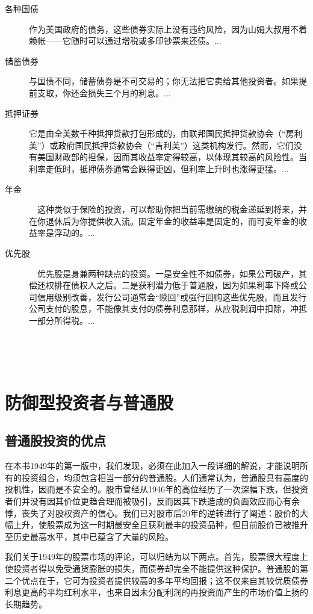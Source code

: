 \documentclass[12pt,oneside]{book}
\begin{document}
\begin{description}
\item[各种国债] 作为美国政府的债务，这些债券实际上没有违约风险，因为山姆大叔用不着赖帐——它随时可以通过增税或多印钞票来还债。...
\item[储蓄债券] 与国债不同，储蓄债券是不可交易的；你无法把它卖给其他投资者。如果提前支取，你还会损失三个月的利息。...
\item[抵押证券] 它是由全美数千种抵押贷款打包形成的，由联邦国民抵押贷款协会（“房利美”）或政府国民抵押贷款协会（“吉利美”）这类机构发行。然而，它们没有美国财政部的担保，因而其收益率定得较高，以体现其较高的风险性。当利率走低时，抵押债券通常会跌得更凶，但利率上升时也涨得更猛。...

\item[年金]　这种类似于保险的投资，可以帮助你把当前需缴纳的税金递延到将来，并在你退休后为你提供收入流。固定年金的收益率是固定的，而可变年金的收益率是浮动的。...

\item[优先股]　优先股是身兼两种缺点的投资。一是安全性不如债券，如果公司破产，其偿还权排在债权人之后。二是获利潜力低于普通股，因为如果利率下降或公司信用级别改善，发行公司通常会“赎回”或强行回购这些优先股。而且发行公司支付的股息，不能像其支付的债券利息那样，从应税利润中扣除，冲抵一部分所得税。...
\end{description}

　

　
\section{防御型投资者与普通股}
\subsection{普通股投资的优点}
在本书1949年的第一版中，我们发现，必须在此加入一段详细的解说，才能说明所有的投资组合，均须包含相当一部分的普通股。人们通常认为，普通股具有高度的投机性，因而是不安全的。股市曾经从1946年的高位经历了一次深幅下跌，但投资者们并没有因其价位更趋合理而被吸引，反而因其下跌造成的负面效应而心有余悸，丧失了对股权资产的信心。我们已对股市后20年的逆转进行了阐述：股价的大幅上升，使股票成为这一时期最安全且获利最丰的投资品种，但目前股价已被推升至历史最高水平，其中已蕴含了大量的风险。

我们关于1949年的股票市场的评论，可以归结为以下两点。首先，股票很大程度上使投资者得以免受通货膨胀的损失，而债券却完全不能提供这种保护。普通股的第二个优点在于，它可为投资者提供较高的多年平均回报；这不仅来自其较优质债券利息更高的平均红利水平，也来自因未分配利润的再投资而产生的市场价值上扬的长期趋势。
\end{document}
